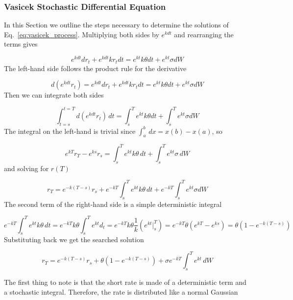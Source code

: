 \subsubsection{Vasicek Stochastic Differential Equation}
\label{vasicek-stochastic-differential-equation}

In this Section we outline the steps necessary to determine the solutions of Eq.~\ref{eq:vasicek_process}.
Multiplying both sides by \(e^{kdt}\) and rearranging the terms gives

\begin{equation*}
	e^{kdt}dr_t + e^{kdt}kr_t dt = e^{kt}k\theta dt + e^{kt}\sigma dW
\end{equation*}
The left-hand side follows the product rule for the derivative

\begin{equation*}
	d(e^{kdt}r_t) = e^{kdt}dr_t + e^{kdt}kr_t dt= e^{kt}k\theta dt + e^{kt}\sigma dW
\end{equation*}
Then we can integrate both sides

\begin{equation*}
	\int^{t=T}_{t=s} d(e^{kdt}r_t)\,dt = \int^T_s e^{kt}k\theta dt +\int^T_s e^{kt}\sigma dW
\end{equation*}
The integral on the left-hand is trivial since \(\int^b_a\,dx = x(b)-x(a)\), so

\begin{equation*}
	e^{kT}r_T - e^{ks}r_s = \int^T_s e^{kt}k\theta\,dt +\int^T_s e^{kt}\sigma\,dW
\end{equation*}
and solving for $r(T)$

\begin{equation*}
	r_T=e^{-k(T-s)}r_s+ e^{-kT}\int^T_s e^{kt}k\theta\,dt +e^{-kT}\int^T_s e^{kt}\sigma dW
\end{equation*}
The second term of the right-hand side is a simple deterministic integral

\begin{equation*}
	e^{-kT}\int^T_s e^{kt}k\theta\,dt=e^{-kT}k\theta\int^T_s e^{kt}d_t=e^{-kT}k\theta\frac{1}{k}(e^{kt}|^T_s)= e^{-kT}\theta(e^{kT}-e^{ks})=\theta\left(1-e^{-k(T-s)}\right)
\end{equation*}
Substituting back we get the searched solution

\begin{equation}
	r_T=e^{-k(T-s)} r_s+\theta(1-e^{-k(T-s)})+ \sigma e^{-kT}\int^T_s e^{kt}\,dW
\end{equation}

The first thing to note is that the short rate is made of a deterministic term
and a stochastic integral.
Therefore, the rate is distributed like a normal Gaussian

